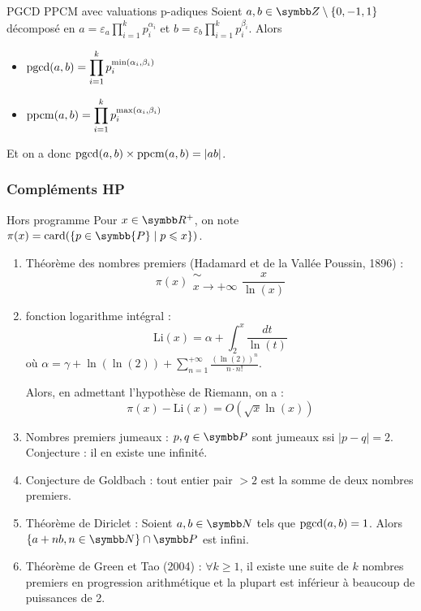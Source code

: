 
\begin{proposition}{PGCD PPCM avec valuations p-adiques}{}
    Soient $a, b \in \Z \setminus \{0, -1, 1\}$ décomposé en 
    $\displaystyle a = \varepsilon_a \prod_{i = 1}^k p_i^{\alpha_i}$ et
    $\displaystyle b = \varepsilon_b \prod_{i = 1}^k p_i^{\beta_i}$. 
    Alors 
    
    \begin{itemize}
        \item $\displaystyle \operatorname{pgcd}(a, b) = \prod_{i = 1}^k p_i^{\min(\alpha_i, \beta_i)}$
        \item $\displaystyle \operatorname{ppcm}(a, b) = \prod_{i = 1}^k p_i^{\max(\alpha_i, \beta_i)}$
    \end{itemize} 
    
    Et on a donc $\displaystyle \operatorname{pgcd}(a, b) \times \operatorname{ppcm}(a, b) = |ab|$.
\end{proposition}

\subsubsection{Compléments HP}

\begin{proposition}{Hors programme}{}
    Pour $x \in \R^+$, on note $\pi(x) = \text{card}(\{p \in \symbb{P} \mid p \leqslant x\})$.

    \begin{enumerate}
        \item Théorème des nombres premiers (Hadamard et de la Vallée Poussin, 1896) :
        \[\pi(x) \substack{\sim \\ x \to + \infty} \frac x {\ln(x)}\]
        \item fonction logarithme intégral : 
        \[\mathrm{Li}(x) = \alpha + \int_2^x \frac {dt}{\ln(t)}\]
        où $\displaystyle \alpha = \gamma + \ln(\ln(2)) + \sum_{n = 1}^{+\infty} \frac{(\ln(2))^n}{n \cdot n!}$. 

        Alors, en admettant l'hypothèse de Riemann, on a : 
        \[\pi(x)  - \mathrm{Li}(x) = O(\sqrt x \ln(x))\]
        \item Nombres premiers jumeaux : $p, q \in \symbb P$ sont jumeaux ssi $|p - q| = 2$. 
        Conjecture : il en existe une infinité. 
        \item Conjecture de Goldbach : tout entier pair $> 2$ est la somme de deux nombres premiers.
    
        \item Théorème de Diriclet : Soient $a, b \in \N$ tels que $\operatorname{pgcd}(a, b) = 1$. Alors 
        $\{a + nb, n \in \N\} \cap \symbb P$ est infini.
        \item Théorème de Green et Tao (2004) : $\forall k \geqslant 1$, il existe une suite de $k$ nombres premiers 
        en progression arithmétique et la plupart est inférieur à beaucoup de puissances de 2.
    \end{enumerate}
\end{proposition}

